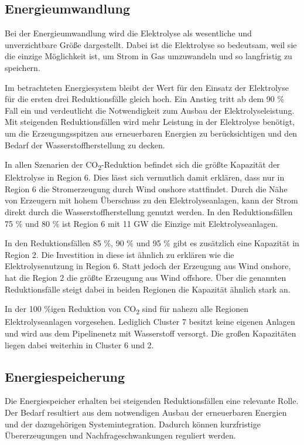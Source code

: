 \subsection{Energieumwandlung}
Bei der Energieumwandlung wird die Elektrolyse als wesentliche und unverzichtbare Größe dargestellt. Dabei ist die Elektrolyse so bedeutsam, weil sie die einzige Möglichkeit ist, um Strom in Gas umzuwandeln und so langfristig zu speichern.

Im betrachteten Energiesystem bleibt der Wert für den Einsatz der Elektrolyse für die ersten drei Reduktionsfälle gleich hoch. Ein Anstieg tritt ab dem 90 \% Fall ein und verdeutlicht die Notwendigkeit zum Ausbau der Elektrolyseleistung. Mit steigenden Reduktionsfällen wird mehr Leistung in der Elektrolyse benötigt, um die Erzeugungsspitzen aus erneuerbaren Energien zu berücksichtigen und den Bedarf der Wasserstoffherstellung zu decken. 


In allen Szenarien der CO\textsubscript{2}-Reduktion befindet sich die größte Kapazität der Elektrolyse in Region 6. Dies lässt sich vermutlich damit erklären, dass nur in Region 6 die Stromerzeugung durch Wind onshore stattfindet. Durch die Nähe von Erzeugern mit hohem Überschuss zu den Elektrolyseanlagen, kann der Strom direkt durch die Wasserstoffherstellung genutzt werden. In den Reduktionsfällen 75 \% und 80 \% ist Region 6 mit 11 GW die Einzige mit Elektrolyseanlagen.

In den Reduktionsfällen 85 \%, 90 \% und 95 \% gibt es zusätzlich eine Kapazität in Region 2. Die Investition in diese ist ähnlich zu erklären wie die Elektrolysenutzung in Region 6. Statt jedoch der Erzeugung aus Wind onshore, hat die Region 2 die größte Erzeugung aus Wind offshore.
Über die genannten Reduktionsfälle steigt dabei in beiden Regionen die Kapazität ähnlich stark an. 

In der 100 \%igen Reduktion von CO\textsubscript{2} sind für nahezu alle Regionen Elektrolyseanlagen vorgesehen. Lediglich Cluster 7 besitzt keine eigenen Anlagen und wird aus dem Pipelinenetz mit Wasserstoff versorgt. Die großen Kapazitäten liegen dabei weiterhin in Cluster 6 und 2.

\subsection{Energiespeicherung}
Die Energiespeicher erhalten bei steigenden Reduktionsfällen eine relevante Rolle. Der Bedarf resultiert aus dem notwendigen Ausbau der erneuerbaren Energien und der dazugehörigen Systemintegration. 
Dadurch können kurzfristige Übererzeugungen und Nachfrageschwankungen reguliert werden. 

